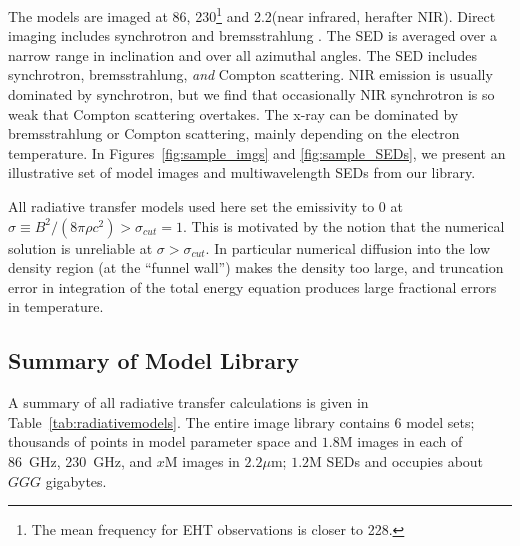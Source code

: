 The models are imaged at 86\GHz, 230\GHz\footnote{The mean frequency for  EHT observations is closer to 228\GHz.} and 2.2\um (near infrared, herafter NIR).
Direct imaging includes synchrotron and bremsstrahlung \citep[both ion-electron and electron-electron; see][for a recent review]{2020ApJ...898...50Y}.
The SED is averaged over a narrow range in inclination and over all azimuthal angles.
The SED includes synchrotron, bremsstrahlung, \emph{and} Compton scattering.
NIR emission is usually dominated by synchrotron, but we find that occasionally NIR synchrotron is so weak that Compton scattering overtakes.
The x-ray can be dominated by bremsstrahlung or Compton scattering, mainly depending on the electron temperature.
In Figures~\ref{fig:sample_imgs} and \ref{fig:sample_SEDs}, we present an illustrative set of model images and multiwavelength SEDs from our library.

All radiative transfer models used here set the emissivity to $0$ at $\sigma \equiv B^2/(8\pi\rho c^2) > \sigma_{cut} = 1$.  This is motivated by the notion that the numerical solution is unreliable at $\sigma > \sigma_{cut}$.  In particular numerical diffusion into the low density region (at the ``funnel wall'') makes the density too large, and truncation error in integration of the total energy equation produces large fractional errors in temperature.

\subsection{Summary of \sgra Model Library}


A summary of all radiative transfer calculations is given in Table~\ref{tab:radiativemodels}. The entire image library 
contains $6$ model sets; thousands of points in model parameter space and 
$1.8$M images in each of 86~GHz, 230~GHz, and $x$M images in $2.2\mu$m; 
$1.2$M SEDs and occupies about $GGG$ gigabytes.


